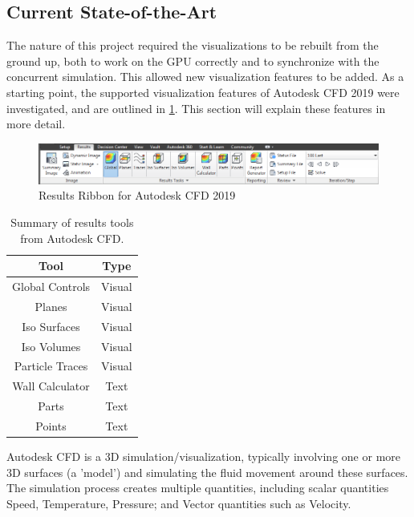 \subsection{Current State-of-the-Art}
The nature of this project required the visualizations to be rebuilt from the ground up, both to work on the GPU correctly and to synchronize with the concurrent simulation.
This allowed new visualization features to be added.
As a starting point, the supported visualization features of Autodesk CFD 2019 were investigated, and are outlined in \cref{tab:AutodeskCFDSummary}.
This section will explain these features in more detail.

\begin{figure}[ht]
    \centering
    \includegraphics[width=\linewidth]{Ch20Research/figures/results_ribbon.png}
    \caption{Results Ribbon for Autodesk CFD 2019\cite[Results Visualization]{AutodeskCFDManual}}
    \label{fig:AutodeskCFDRibbon}
\end{figure}

\begin{table}[ht]
    \centering
    \begin{tabular}{c|c}
        Tool & Type \\
        \hline
        Global Controls & Visual \\
        Planes & Visual \\
        Iso Surfaces & Visual \\
        Iso Volumes & Visual \\
        Particle Traces & Visual \\
        \hline
        Wall Calculator & Text \\
        Parts & Text \\
        Points & Text \\
    \end{tabular}
    \caption{Summary of results tools from Autodesk CFD.}
    \label{tab:AutodeskCFDSummary}
\end{table}

Autodesk CFD is a 3D simulation/visualization, typically involving one or more 3D surfaces (a 'model') and simulating the fluid movement around these surfaces.
The simulation process creates multiple quantities, including scalar quantities Speed, Temperature, Pressure; and Vector quantities such as Velocity.

